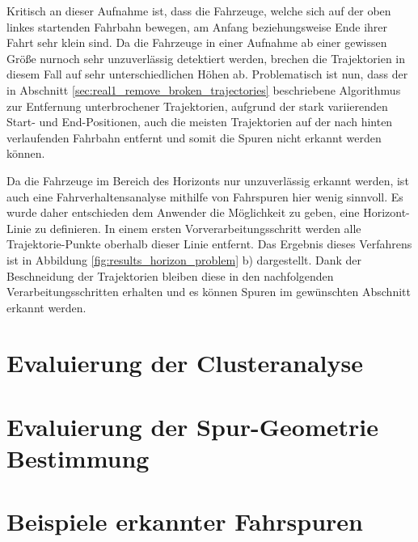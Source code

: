 Kritisch an dieser Aufnahme ist, dass die Fahrzeuge, welche sich auf der oben linkes startenden Fahrbahn bewegen,
am Anfang beziehungsweise Ende ihrer Fahrt sehr klein sind. Da die Fahrzeuge in einer Aufnahme ab einer gewissen Größe
nurnoch sehr unzuverlässig detektiert werden, brechen die Trajektorien in diesem Fall auf sehr
unterschiedlichen Höhen ab.
Problematisch ist nun, dass der in Abschnitt \ref{sec:real1_remove_broken_trajectories} beschriebene Algorithmus
zur Entfernung unterbrochener Trajektorien, aufgrund der stark variierenden Start- und End-Positionen,
auch die meisten Trajektorien auf der nach hinten verlaufenden Fahrbahn entfernt und somit die Spuren nicht erkannt werden können.

Da die Fahrzeuge im Bereich des Horizonts nur unzuverlässig erkannt werden, ist auch eine Fahrverhaltensanalyse
mithilfe von Fahrspuren hier wenig sinnvoll. Es wurde daher entschieden dem Anwender die Möglichkeit zu geben, eine
Horizont-Linie zu definieren. In einem ersten Vorverarbeitungsschritt werden alle Trajektorie-Punkte oberhalb dieser
Linie entfernt. Das Ergebnis dieses Verfahrens ist in Abbildung \ref{fig:results_horizon_problem} b)
dargestellt. Dank der Beschneidung der Trajektorien bleiben diese in den nachfolgenden Verarbeitungsschritten
erhalten und es können Spuren im gewünschten Abschnitt erkannt werden.

\section{Evaluierung der Clusteranalyse}

\section{Evaluierung der Spur-Geometrie Bestimmung}

\section{Beispiele erkannter Fahrspuren}
